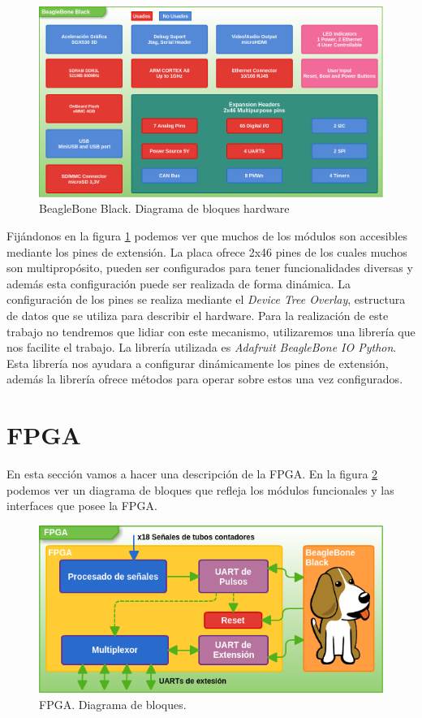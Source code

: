 	\begin{figure}[h]
		\centering
		\includegraphics[keepaspectratio, width=1\textwidth]{./img/beaglebone.png}
		\caption{BeagleBone Black. Diagrama de bloques hardware}
		\label{fig:beaglebone}
	\end{figure}
	Fijándonos en la figura \ref{fig:beaglebone} podemos ver que muchos de los módulos son accesibles mediante los pines de extensión\cite{BeagleWikiExp}.
	La placa ofrece 2x46 pines de los cuales muchos son multipropósito, pueden ser configurados para tener funcionalidades diversas y además esta
	configuración puede ser realizada de forma dinámica. La configuración de los pines se realiza mediante el \emph{Device Tree Overlay}, estructura de
	datos que se utiliza para describir el hardware. Para la realización de este trabajo no tendremos que lidiar con este mecanismo, utilizaremos una
	librería que nos facilite el trabajo. La librería utilizada es \emph{Adafruit BeagleBone IO Python}\cite{AdaFruitGit}. Esta librería nos ayudara a
      	configurar dinámicamente los pines de extensión, además la librería ofrece métodos para operar sobre estos una vez configurados.


\section{FPGA}
	En esta sección vamos a hacer una descripción de la FPGA. En la figura \ref{fig:fpga} podemos ver un diagrama de bloques que refleja los módulos
	funcionales y las interfaces que posee la FPGA.
	\begin{figure}[h]
		\centering
		\includegraphics[keepaspectratio, width=1\textwidth]{./img/fpga.png}
		\caption{FPGA. Diagrama de bloques.}
		\label{fig:fpga}
	\end{figure}	
